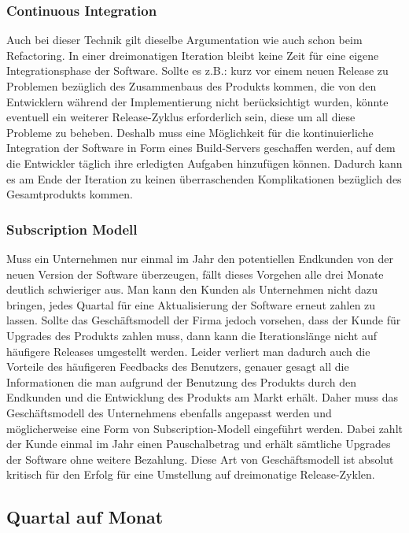 \subsubsection{Continuous Integration}
\label{minisec:continuous-integration}
Auch bei dieser Technik gilt dieselbe Argumentation wie auch schon beim
Refactoring. In einer dreimonatigen Iteration bleibt keine Zeit für eine
eigene Integrationsphase der Software. Sollte es z.B.: kurz vor einem neuen
Release zu Problemen bezüglich des Zusammenbaus des Produkts kommen, die von
den Entwicklern während der Implementierung nicht berücksichtigt wurden,
könnte eventuell ein weiterer Release-Zyklus erforderlich sein, diese um all
diese Probleme zu beheben. Deshalb muss eine Möglichkeit für die
kontinuierliche Integration der Software in Form eines Build-Servers
geschaffen werden, auf dem die Entwickler täglich ihre erledigten Aufgaben
hinzufügen können. Dadurch kann es am Ende der Iteration zu keinen
überraschenden Komplikationen bezüglich des Gesamtprodukts kommen.

\subsubsection{Subscription Modell}
\label{minisec:subscription-modell}
Muss ein Unternehmen nur einmal im Jahr den potentiellen Endkunden von der
neuen Version der Software überzeugen, fällt dieses Vorgehen alle drei Monate
deutlich schwieriger aus. Man kann den Kunden als Unternehmen nicht dazu
bringen, jedes Quartal für eine Aktualisierung der Software erneut zahlen zu
lassen. Sollte das Geschäftsmodell der Firma jedoch vorsehen, dass der Kunde
für Upgrades des Produkts zahlen muss, dann kann die Iterationslänge nicht auf
häufigere Releases umgestellt werden. Leider verliert man dadurch auch die
Vorteile des häufigeren Feedbacks des Benutzers, genauer gesagt all die
Informationen die man aufgrund der Benutzung des Produkts durch den Endkunden
und die Entwicklung des Produkts am Markt erhält. Daher muss das
Geschäftsmodell des Unternehmens ebenfalls angepasst werden und möglicherweise
eine Form von Subscription-Modell eingeführt werden. Dabei zahlt der Kunde
einmal im Jahr einen Pauschalbetrag und erhält sämtliche Upgrades der Software
ohne weitere Bezahlung. Diese Art von Geschäftsmodell ist absolut kritisch für
den Erfolg für eine Umstellung auf dreimonatige Release-Zyklen.


\subsection{Quartal auf Monat}
\label{subsec:quartal-auf-monat}

